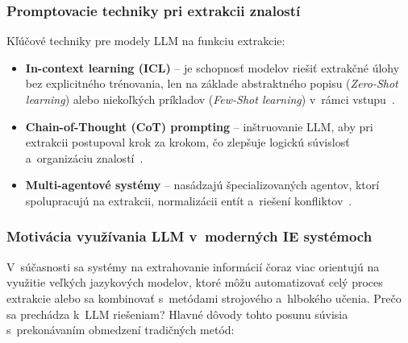 \subsubsection{Promptovacie techniky pri extrakcii znalostí}
Kľúčové techniky pre modely LLM na funkciu extrakcie:
\begin{itemize}
  \item \textbf{In-context learning (ICL)} – je schopnosť modelov riešiť extrakčné úlohy bez explicitného trénovania, len na základe abstraktného popisu (\textit{Zero-Shot learning}) alebo niekoľkých príkladov (\textit{Few-Shot learning}) v~rámci vstupu~\cite{IEtoSuppScien2025}.
  \item \textbf{Chain-of-Thought (CoT) prompting} – inštruovanie LLM, aby pri extrakcii postupoval krok za krokom, čo zlepšuje logickú súvislosť a~organizáciu znalostí~\cite{IEtoSuppScien2025}.
  \item \textbf{Multi-agentové systémy} – nasádzajú špecializovaných agentov, ktorí spolupracujú na extrakcii, normalizácii entít a~riešení konfliktov~\cite{llmEmpKGcons2025}.
\end{itemize}


\subsubsection{Motivácia využívania LLM v~moderných IE systémoch}
V~súčasnosti sa systémy na extrahovanie informácií čoraz viac orientujú na využitie veľkých jazykových modelov, ktoré môžu automatizovať celý proces extrakcie alebo sa kombinovať s~metódami strojového a~hlbokého učenia. Prečo sa prechádza k~LLM riešeniam? Hlavné dôvody tohto posunu súvisia s~prekonávaním obmedzení tradičných metód:

